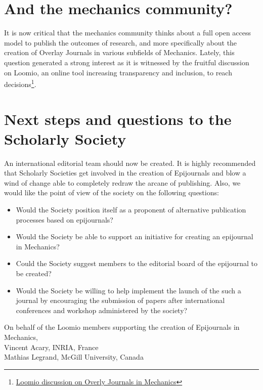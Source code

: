 \documentclass[11pt]{article}
\begin{document}
\section*{And the mechanics community?}
It is now critical that the mechanics community thinks about a full open access model to publish the outcomes of research, and more specifically about the creation of Overlay Journals in various subfields of Mechanics. Lately, this question generated a strong interest as it is witnessed by the fruitful discussion on Loomio, an online tool increasing transparency and inclusion, to reach decisions\footnote{\href{https://www.loomio.org/invitations/aa0a97be9a80ba509623}{Loomio discussion on Overly Journals in Mechanics}}.

\section*{Next steps and questions to the Scholarly Society}
An international editorial team should now be created. It is highly recommended that Scholarly Societies get involved in the creation of Epijournals and blow a wind of change able to completely redraw the arcane of publishing. Also, we would like the point of view of the society on the following questions:
\begin{itemize}
\item Would the Society position itself as a proponent of alternative publication processes based on epijournals?
\item Would the Society be able to support an initiative for creating an epijournal in Mechanics?
\item Could the Society suggest members to the editorial board of the epijournal to be created?
\item Would the Society be willing to help implement the launch of the such a journal by encouraging the submission of papers after international conferences and workshop administered by the society?\\[15pt]
\end{itemize}
On behalf of the Loomio members supporting the creation of Epijournals in Mechanics, \\[10pt]
Vincent Acary, INRIA, France\\
Mathias Legrand, McGill University, Canada
\end{document}
